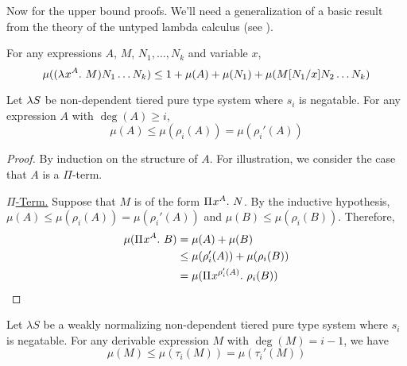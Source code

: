 \documentclass{article}
\begin{document}
Now for the upper bound proofs.
We'll need a generalization of a basic result from the theory of the untyped lambda calculus (see \cite{xi-1997}).

\begin{lemma}
\label{lem:mu-upper-bound}
For any expressions $A$, $M$, $N_1, \dots, N_k$ and variable $x$,
\[
    \mu((\lambda^{} x^{A}. \ M) N_1 \dots N_k) \leq 1 + \mu(A) + \mu(N_1) + \mu(M[N_1/x] N_2 \dots N_k)
\]
\end{lemma}

\begin{lemma}\label{lem:mu-rho}
Let $\lambda S$ be non-dependent tiered pure type system where $s_i$ is negatable.
For any expression $A$ with $\deg(A) \geq i$,
\[
    \mu(A) \leq \mu(\rho_i(A)) = \mu(\rho_i'(A))
\]
\end{lemma}

\begin{proof}
By induction on the structure of $A$.
For illustration, we consider the case that $A$ is a $\Pi$-term.

\noindent\underline{$\Pi$-Term.}
Suppose that $M$ is of the form ${\Pi^{} {x}^{A}. \ {N}}$.
By the inductive hypothesis, $\mu(A) \leq \mu(\rho_i(A)) = \mu(\rho_i'(A))$ and $\mu(B) \leq \mu(\rho_i(B))$. Therefore,
\begin{align*}
\mu({\Pi^{} {x}^{A}. \ {B}}) &=
\mu(A) + \mu(B) \\ &\leq
\mu(\rho_i'(A)) + \mu(\rho_i(B)) \\ &=
\mu({\Pi^{} {x}^{\rho_i'(A)}. \ {\rho_i(B)}})
\end{align*}
\end{proof}

\begin{lemma}\label{lem:mu-tau}
Let $\lambda S$ be a weakly normalizing non-dependent tiered pure type system where $s_i$ is negatable.
For any derivable expression $M$ with $\deg(M) = i - 1$, we have
\[
    \mu(M) \leq \mu(\tau_i(M)) = \mu(\tau_i'(M))
\]
\end{lemma}
\end{document}
